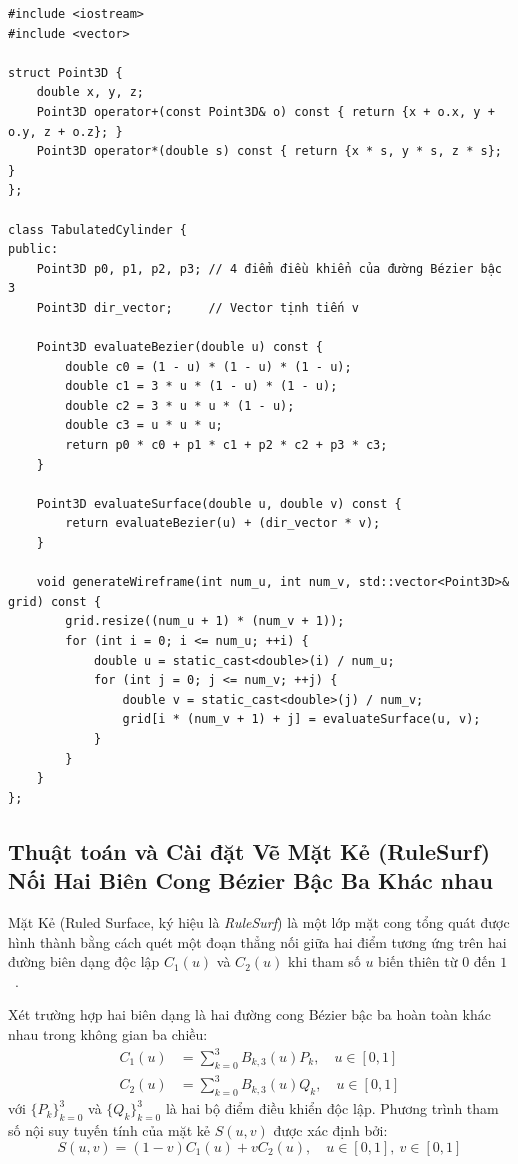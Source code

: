 \begin{verbatim}
#include <iostream>
#include <vector>

struct Point3D {
    double x, y, z;
    Point3D operator+(const Point3D& o) const { return {x + o.x, y + o.y, z + o.z}; }
    Point3D operator*(double s) const { return {x * s, y * s, z * s}; }
};

class TabulatedCylinder {
public:
    Point3D p0, p1, p2, p3; // 4 điểm điều khiển của đường Bézier bậc 3
    Point3D dir_vector;     // Vector tịnh tiến v

    Point3D evaluateBezier(double u) const {
        double c0 = (1 - u) * (1 - u) * (1 - u);
        double c1 = 3 * u * (1 - u) * (1 - u);
        double c2 = 3 * u * u * (1 - u);
        double c3 = u * u * u;
        return p0 * c0 + p1 * c1 + p2 * c2 + p3 * c3;
    }

    Point3D evaluateSurface(double u, double v) const {
        return evaluateBezier(u) + (dir_vector * v);
    }

    void generateWireframe(int num_u, int num_v, std::vector<Point3D>& grid) const {
        grid.resize((num_u + 1) * (num_v + 1));
        for (int i = 0; i <= num_u; ++i) {
            double u = static_cast<double>(i) / num_u;
            for (int j = 0; j <= num_v; ++j) {
                double v = static_cast<double>(j) / num_v;
                grid[i * (num_v + 1) + j] = evaluateSurface(u, v);
            }
        }
    }
};
\end{verbatim}

\subsection{Thuật toán và Cài đặt Vẽ Mặt Kẻ (RuleSurf) Nối Hai Biên Cong Bézier Bậc Ba Khác nhau}
\label{subsec:rulesurf_bezier}

Mặt Kẻ (Ruled Surface, ký hiệu là \textit{RuleSurf}) là một lớp mặt cong tổng quát được hình thành bằng cách quét một đoạn thẳng nối giữa hai điểm tương ứng trên hai đường biên dạng độc lập $C_1(u)$ và $C_2(u)$ khi tham số $u$ biến thiên từ $0$ đến $1$~\citep{foley1996computer}.

Xét trường hợp hai biên dạng là hai đường cong Bézier bậc ba hoàn toàn khác nhau trong không gian ba chiều:
\begin{align}
C_1(u) &= \sum_{k=0}^3 B_{k, 3}(u) P_k, \quad u \in [0, 1] \\
C_2(u) &= \sum_{k=0}^3 B_{k, 3}(u) Q_k, \quad u \in [0, 1]
\end{align}
với $\{P_k\}_{k=0}^3$ và $\{Q_k\}_{k=0}^3$ là hai bộ điểm điều khiển độc lập. Phương trình tham số nội suy tuyến tính của mặt kẻ $S(u, v)$ được xác định bởi:
\begin{equation}
\label{eq:rulesurf_parametric}
S(u, v) = (1 - v) C_1(u) + v C_2(u), \quad u \in [0, 1], \ v \in [0, 1]
\end{equation}

